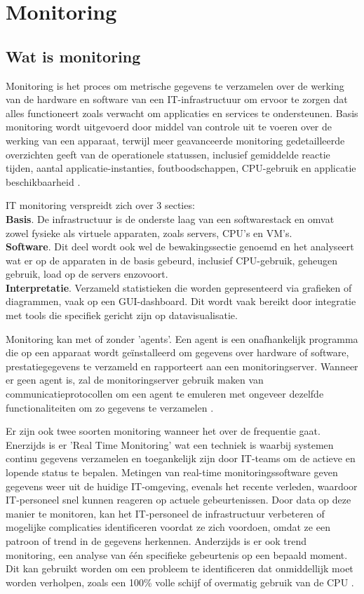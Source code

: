 \section{Monitoring}
\subsection{Wat is monitoring}
Monitoring is het proces om metrische gegevens te verzamelen over de werking van de hardware en software van een IT-infrastructuur om ervoor te zorgen dat alles functioneert zoals verwacht om applicaties en services te ondersteunen. Basis monitoring wordt uitgevoerd door middel van controle uit te voeren over de werking van een apparaat, terwijl meer geavanceerde monitoring gedetailleerde overzichten geeft van de operationele statussen, inclusief gemiddelde reactie tijden, aantal applicatie-instanties, foutboodschappen, CPU-gebruik en applicatie beschikbaarheid \autocite{TechTarget2020}.

IT monitoring verspreidt zich over 3 secties:\\
\textbf{Basis}. De infrastructuur is de onderste laag van een softwarestack en omvat zowel fysieke als virtuele apparaten, zoals servers, CPU's en VM's. \\
\textbf{Software}. Dit deel wordt ook wel de bewakingssectie genoemd en het analyseert wat er op de apparaten in de basis gebeurd, inclusief CPU-gebruik, geheugen gebruik, load op de servers enzovoort.\\
\textbf{Interpretatie}. Verzameld statistieken die worden gepresenteerd via grafieken of diagrammen, vaak op een GUI-dashboard. Dit wordt vaak bereikt door integratie met tools die specifiek gericht zijn op datavisualisatie.

Monitoring kan met of zonder 'agents'. Een agent is een onafhankelijk programma die op een apparaat wordt geïnstalleerd om gegevens over hardware of software, prestatiegegevens te verzameld en rapporteert aan een monitoringserver. Wanneer er geen agent is, zal de monitoringserver gebruik maken van communicatieprotocollen om een agent te emuleren met ongeveer dezelfde functionaliteiten om zo gegevens te verzamelen \autocite{TechTarget2020}.

Er zijn ook twee soorten monitoring wanneer het over de frequentie gaat. Enerzijds is er 'Real Time Monitoring' wat een techniek is waarbij systemen continu gegevens verzamelen en toegankelijk zijn door IT-teams om de actieve en lopende status te bepalen. Metingen van real-time monitoringssoftware geven gegevens weer uit de huidige IT-omgeving, evenals het recente verleden, waardoor IT-personeel snel kunnen reageren op actuele gebeurtenissen. Door data op deze manier te monitoren, kan het IT-personeel de infrastructuur verbeteren of mogelijke complicaties identificeren voordat ze zich voordoen, omdat ze een patroon of trend in de gegevens herkennen. Anderzijds is er ook trend monitoring, een analyse van één specifieke gebeurtenis op een bepaald moment. Dit kan gebruikt worden om een probleem te identificeren dat onmiddellijk moet worden verholpen, zoals een 100\% volle schijf of overmatig gebruik van de CPU \autocite{TechTarget2020}.


